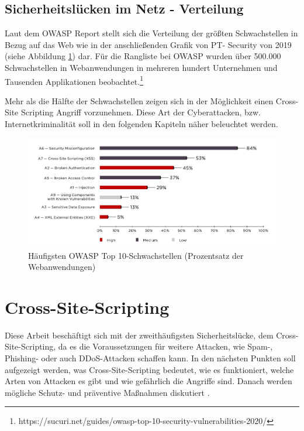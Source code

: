 \subsection{Sicherheitslücken im Netz - Verteilung}
\label{subsection:securityrisks_in_the_web}

Laut dem OWASP Report stellt sich die Verteilung der größten Schwachstellen in Bezug auf das Web wie in der anschließenden Grafik von PT- Security von 2019 (siehe Abbildung \ref{figure:most-common-owasp-top10}) dar. Für die Rangliste bei OWASP wurden über 500.000 Schwachstellen in Webanwendungen in mehreren hundert Unternehmen und Tausenden Applikationen beobachtet.\footnote{https://sucuri.net/guides/owasp-top-10-security-vulnerabilities-2020/}

Mehr als die Hälfte der Schwachstellen zeigen sich in der Möglichkeit einen Cross- Site Scripting Angriff vorzunehmen. Diese Art der Cyberattacken, bzw. Internetkriminalität soll in den folgenden Kapiteln näher beleuchtet werden.

\begin{figure}[ht]
	\centering
	\includegraphics[width=1\linewidth]{images/most-common-owasp-top10-vulnerabilities.jpg}
	\caption[Häufigsten OWASP Top 10-Schwachstellen]
	{Häufigsten OWASP Top 10-Schwachstellen (Prozentsatz der Webanwendungen) \autocite{ptsecurity2019}}
	\label{figure:most-common-owasp-top10}
\end{figure}

\section{Cross-Site-Scripting}
\label{section:cross-site-scripting}

Diese Arbeit beschäftigt sich mit der zweithäufigsten Sicherheitslücke, dem Cross-Site-Scripting, da es die Voraussetzungen für weitere Attacken, wie Spam-, Phishing- oder auch DDoS-Attacken schaffen kann. In den nächsten Punkten soll aufgezeigt werden, was Cross-Site-Scripting bedeutet, wie es funktioniert, welche Arten von Attacken es gibt und wie gefährlich die Angriffe sind. Danach werden mögliche Schutz- und präventive Maßnahmen diskutiert \autocite{ptsecurity2019}.

